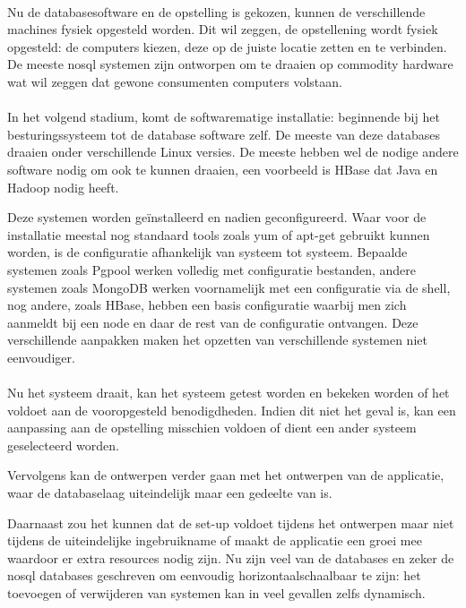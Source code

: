 \documentclass{book}
\begin{document}
\paragraph{} Nu de databasesoftware en de opstelling is gekozen, kunnen de verschillende machines fysiek opgesteld worden. Dit wil zeggen, de opstellening wordt fysiek opgesteld: de computers kiezen, deze op de juiste locatie zetten en te verbinden. De meeste \gls{nosql} systemen zijn ontworpen om te draaien op commodity hardware wat wil zeggen dat gewone consumenten computers volstaan. 

\paragraph{} In het volgend stadium, komt de softwarematige installatie: beginnende bij het besturingssysteem tot de database software zelf. De meeste van deze databases draaien onder verschillende Linux versies. De meeste hebben wel de nodige andere software nodig om ook te kunnen draaien, een voorbeeld is HBase dat Java en Hadoop nodig heeft. 

Deze systemen worden geïnstalleerd en nadien geconfigureerd. Waar voor de installatie meestal nog standaard tools zoals \gls{yum} of \gls{apt-get} gebruikt kunnen worden, is de configuratie afhankelijk van systeem tot systeem. Bepaalde systemen zoals Pgpool werken volledig met configuratie bestanden, andere systemen zoals MongoDB werken voornamelijk met een configuratie via de shell, nog andere, zoals HBase, hebben een basis configuratie waarbij men zich aanmeldt bij een node en daar de rest van de configuratie ontvangen. Deze verschillende aanpakken maken het opzetten van verschillende systemen niet eenvoudiger.

\paragraph{} Nu het systeem draait, kan het systeem getest worden en bekeken worden of het voldoet aan de vooropgesteld benodigdheden. Indien dit niet het geval is, kan een aanpassing aan de opstelling misschien voldoen of dient een ander systeem geselecteerd worden. 

Vervolgens kan de ontwerpen verder gaan met het ontwerpen van de applicatie, waar de databaselaag uiteindelijk maar een gedeelte van is. 

Daarnaast zou het kunnen dat de set-up voldoet tijdens het ontwerpen maar niet tijdens de uiteindelijke ingebruikname of maakt de applicatie een groei mee waardoor er extra resources nodig zijn. Nu zijn veel van de databases en zeker de \gls{nosql} databases geschreven om eenvoudig \gls{horizontaalschaalbaar} te zijn: het toevoegen of verwijderen van systemen kan in veel gevallen zelfs dynamisch. 
\end{document}
